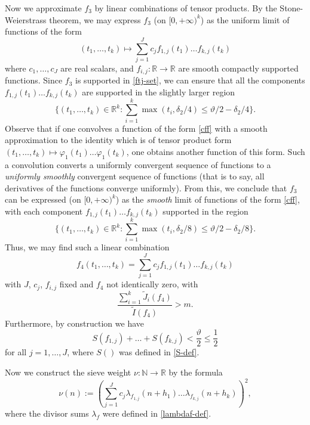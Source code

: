 \documentclass{bmcart}
\theoremstyle{plain}
\theoremstyle{definition}
\newcommand\R{\mathbb{R}}
\newcommand\N{\mathbb{N}}
\begin{document}
Now we approximate $f_3$ by linear combinations of tensor products.  By the Stone-Weierstrass theorem, we may express $f_3$ (on $[0,+\infty)^k$) as the uniform limit of functions
of the form
\begin{equation}\label{cff}
 (t_1,\dots,t_k) \mapsto \sum_{j=1}^J c_j f_{1,j}(t_1) \dots f_{k,j}(t_k)
\end{equation}
where $c_1,\dots,c_J$ are real scalars, and $f_{i,j}: \R \to \R$ are smooth compactly supported functions.  Since $f_3$ is supported in \eqref{ftj-set}, we can ensure that all the components $f_{1,j}(t_1) \dots f_{k,j}(t_k)$ are supported in the slightly larger region
$$ \{ (t_1,\dots,t_k) \in \R^k: \sum_{i=1}^k \max(t_i, \delta_2/4) \leq \vartheta/2 - \delta_2/4 \}.$$
Observe that if one convolves a function of the form \eqref{cff} with a smooth approximation to the identity which is of tensor product form $(t_1,\dots,t_k) \mapsto \varphi_1(t_1) \dots \varphi_1(t_k)$, one obtains another function of this form.  Such a convolution converts a uniformly convergent sequence of functions to a \emph{uniformly smoothly} convergent sequence of functions (that is to say, all derivatives of the functions converge uniformly).  From this, we conclude that $f_3$ can be expressed (on $[0,+\infty)^k$) as the \emph{smooth} limit of functions of the form \eqref{cff}, with each component $f_{1,j}(t_1) \dots f_{k,j}(t_k)$ supported in the region
$$ \{ (t_1,\dots,t_k) \in \R^k: \sum_{i=1}^k \max(t_i, \delta_2/8) \leq \vartheta/2 - \delta_2/8 \}.$$
Thus, we may find such a linear combination
\begin{equation}\label{f4}
 f_4(t_1,\dots,t_k) = \sum_{j=1}^J c_j f_{1,j}(t_1) \dots f_{k,j}(t_k)
\end{equation}
with $J$, $c_j$, $f_{i,j}$ fixed and $f_4$ not identically zero, with
\begin{equation}\label{jbig-6}
 \frac{\sum_{i=1}^k \tilde J_i(f_4)}{\tilde I(f_4)} > m.
\end{equation}
Furthermore, by construction we have
\begin{equation}\label{sfg}
S(f_{1,j}) + \dots + S(f_{k,j}) < \frac{\vartheta}{2} \leq \frac{1}{2}
\end{equation}
for all $j=1,\dots,J$, where $S()$ was defined in \eqref{S-def}.

Now we construct the sieve weight $\nu: \N \to \R$ by the formula
\begin{equation}\label{nu-def}
 \nu(n) := \left( \sum_{j=1}^J c_j \lambda_{f_{1,j}}(n+h_1) \dots \lambda_{f_{k,j}}(n+h_k) \right)^2,
\end{equation}
where the divisor sums $\lambda_f$ were defined in \eqref{lambdaf-def}.
\end{document}
